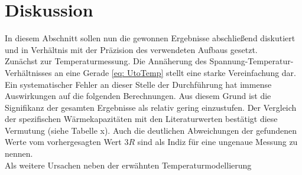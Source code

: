 \section{Diskussion}
In diesem Abschnitt sollen nun die gewonnen Ergebnisse abschließend diskutiert und in
Verhältnis mit der Präzision des verwendeten Aufbaus gesetzt. \\
Zunächst zur Temperaturmessung. Die Annäherung des Spannung-Temperatur-Verhältnisses
an eine Gerade \eqref{eq: UtoTemp} stellt eine starke Vereinfachung dar. Ein systematischer
Fehler an dieser Stelle der Durchführung hat immense Auswirkungen auf die folgenden Berechnungen.
Aus diesem Grund ist die Signifikanz der gesamten Ergebnisse als relativ gering einzustufen.
Der Vergleich der spezifischen Wärmekapazitäten mit den Literaturwerten bestätigt diese Vermutung (siehe
Tabelle x). Auch die deutlichen Abweichungen der gefundenen Werte vom vorhergesagten Wert $3R$ sind als
Indiz für eine ungenaue Messung zu nennen. \\
Als weitere Ursachen neben der erwähnten Temperaturmodellierung 
